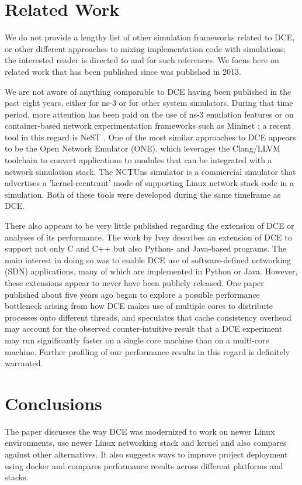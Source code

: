 \documentclass{sig-alternate}
\begin{document}
\section{Related Work}
We do not provide a lengthy list of other simulation frameworks related
to DCE, or other different approaches to mixing implementation code with
simulations; the interested reader is directed to \cite{Tazaki13} and
\cite{Lacage10} for such references.  We focus here on related work that has
been published since \cite{Tazaki13} was published in 2013.

We are not aware of anything comparable to DCE having been published in
the past eight years, either for ns-3 or for other system simulators.  
During that time period, more attention has been paid on the use of
ns-3 emulation features or on container-based network experimentation
frameworks such as Mininet \cite{Handigol12}; a recent tool in this regard is
NeST \cite{Rai20}.  One of the most similar approaches to DCE appears to
be the Open Network Emulator (ONE)\cite{Duggirala12}, which leverages the
Clang/LLVM
toolchain to convert applications to modules that can be integrated
with a network simulation stack.  The NCTUns simulator \cite{Wang03}
is a commercial simulator that advertises a 'kernel-reentrant' mode
of supporting Linux network stack code in a simulation.  Both of these
tools were developed during the same timeframe as DCE.

There also appears to be very little published regarding the extension
of DCE or analyses of its performance.  The work by Ivey \cite{Ivey16}
describes an extension of DCE to support not only C and C++ but also
Python- and Java-based programs.  The main interest in doing so was
to enable DCE use of software-defined networking (SDN) applications,
many of which are implemented in Python or Java.  However, these
extensions appear to never have been publicly released.  
One paper published about five years ago \cite{Wiggins16} began to explore
a possible performance bottleneck arising from how DCE makes use of multiple
cores to distribute processes onto different threads, and speculates that
cache consistency overhead may account for the observed counter-intuitive
result that a DCE experiment may run significantly faster on a single core
machine than on a multi-core machine.   Further profiling of our performance
results in this regard is definitely warranted. 

\section{Conclusions}
The paper discusses the way DCE was modernized to work on newer Linux environments, 
use newer Linux networking stack and kernel and also compares against other alternatives. 
It also suggests ways to improve project deployment using docker and compares performance results across different platforms and stacks.
\end{document}

